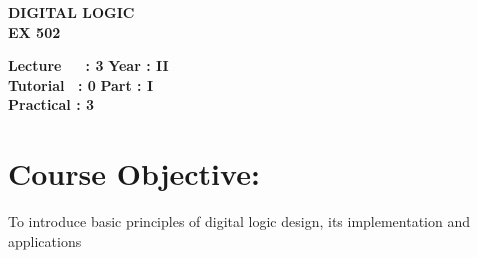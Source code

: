 \begin{center}
    \textbf{\huge{\uppercase{Digital Logic}}}
    \\
    \vspace{.5cm}
    \textbf{\large{EX 502}}
\end{center}

\noindent\textbf{Lecture\ \ \ : 3} \hfill \textbf{Year : II } \\
\textbf{Tutorial \ : 0} \hfill \textbf{Part : I } \\
\textbf{Practical : 3}  \\

\par
\noindent 
\section*{Course Objective:}
To introduce basic principles of digital logic design, its implementation and applications

